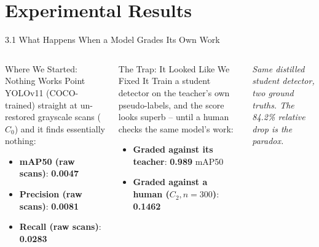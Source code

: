 \documentclass[aspectratio=169,11pt]{beamer}
\newcommand{\evidence}[1]{\textcolor{HildesheimRed}{\textbf{#1}}}
\begin{document}
\section{Experimental Results}

\begin{frame}{3.1 What Happens When a Model Grades Its Own Work}
\scriptsize
\begin{columns}[T]
\begin{block}{Where We Started: Nothing Works}
Point YOLOv11 (COCO-trained) straight at un-restored grayscale scans ($C_0$) and it finds essentially nothing:
\begin{itemize}
    \item \textbf{mAP50 (raw scans)}: \evidence{0.0047}
    \item \textbf{Precision (raw scans)}: \evidence{0.0081}
    \item \textbf{Recall (raw scans)}: \evidence{0.0283}
\end{itemize}
\end{block}

\begin{block}{The Trap: It Looked Like We Fixed It}
Train a student detector on the teacher's own pseudo-labels, and the score looks superb -- until a human checks the same model's work:
\begin{itemize}
    \item \textbf{Graded against its teacher}: \textbf{0.989} mAP50
    \item \textbf{Graded against a human ($C_2, n=300$)}: \evidence{\textbf{0.1462}}
\end{itemize}
\end{block}

\centering
{}
\vskip 0.1cm
\tiny \textit{Same distilled student detector, two ground truths. The 84.2\% relative drop is the paradox.}
\end{columns}
\end{frame}
\end{document}
